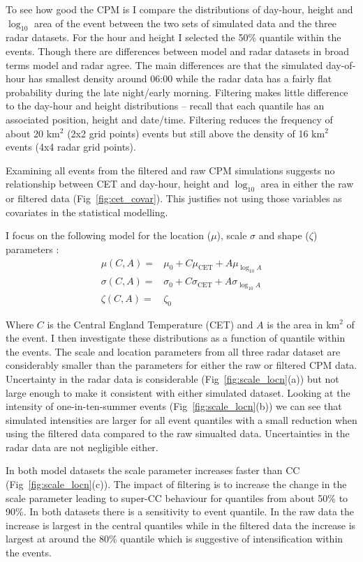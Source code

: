 \documentclass[11pt,a4paper]{article}
\begin{document}
To see how good the CPM is I compare the distributions of  day-hour, height and  $\log_{10}$ area of the event between the two sets of simulated data and the three radar datasets. For the hour and height I selected the 50\% quantile within the events. Though there are differences between model and radar datasets in broad terms model and radar agree. The main differences are that the simulated day-of-hour has smallest density around 06:00 while the radar data has a fairly flat probability during the late night/early morning. Filtering makes little difference to the day-hour and height distributions -- recall that each quantile has an associated position, height and date/time. Filtering reduces the frequency of about 20 km$^2$ (2x2 grid points) events but still above the density of 16 km$^2$ events (4x4 radar grid points). 

Examining all events from the filtered and raw CPM simulations suggests no relationship between CET and day-hour, height and $\log_{10}$ area in either the raw or filtered data (Fig~\ref{fig:cet_covar}). This justifies not using those variables as covariates in the statistical modelling. 

I focus on the following  model for the location ($\mu$), scale $\sigma$ and shape ($\zeta$) parameters :
\begin{align}
	\mu(C,A) =& \mu_0 + C\mu_\text{CET}+A\mu_{\log_{10}A} \\
	 \sigma(C,A) =& \sigma_0 +C\sigma_\text{CET}+A\sigma_{\log_{10}A}\\
	 \zeta(C,A)=&\zeta_0
\end{align}

Where $C$ is the Central England Temperature (CET) and $A$ is the area in km$^2$ of the event.  I then investigate these distributions as a function of quantile within the events.  The scale and location parameters from all three radar dataset are considerably smaller than the parameters for either the raw or filtered CPM data. Uncertainty in the radar data is considerable (Fig~\ref{fig:scale_locn}(a)) but not large enough to make it consistent with either simulated dataset.  Looking at the intensity of one-in-ten-summer events (Fig~\ref{fig:scale_locn}(b)) we can see that simulated intensities are larger for all event quantiles with a small reduction when using the filtered data compared to the raw simualted data. Uncertainties in the radar data are not  negligible either. 

In both model datasets the scale parameter increases faster than CC (Fig~\ref{fig:scale_locn}(c)). The impact of filtering is to increase the change in the scale parameter leading to super-CC behaviour for quantiles from about 50\% to 90\%.  In both datasets there is a sensitivity to event quantile. In the raw data the increase is largest in the central quantiles while in the filtered data the increase is largest at around the 80\% quantile which is suggestive of intensification within the events. 
\end{document}
